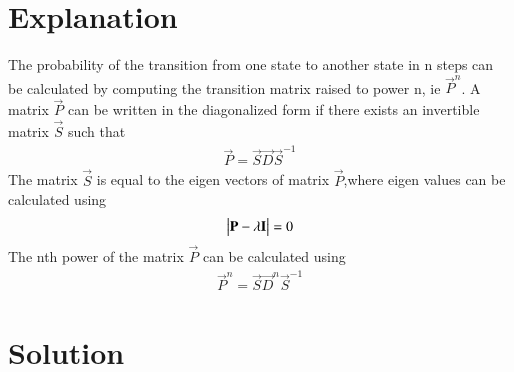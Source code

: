\documentclass[journal,12pt,twocolumn]{IEEEtran}
\begin{document}
\section{Explanation}
 The probability of the transition from one state to another state in n steps can be calculated by computing the transition matrix raised to power n, ie $\vec{P}^n$.\newline
A matrix $\vec{P}$ can be written in the diagonalized  form if there exists an invertible matrix $\vec{S}$ such that
\begin{align}
\vec{P} = \vec{S}\vec{D}\vec{S}^{-1}\label{eq:1}
\end{align}
The matrix $\vec{S}$ is equal to the eigen vectors of matrix $\vec{P}$,where eigen values can be calculated using
\begin{align}
	\begin{vmatrix}\mathbf{P}-\lambda\mathbf{I}\end{vmatrix}=0\label{eq:2}
\end{align}
The nth power of the matrix $\vec{P}$ can be calculated using 
\begin{align}
	\vec{P}^n = \vec{S}\vec{D}^n\vec{S}^{-1}\label{eq:nthpower}
\end{align} 

\section{Solution}
\end{document}
